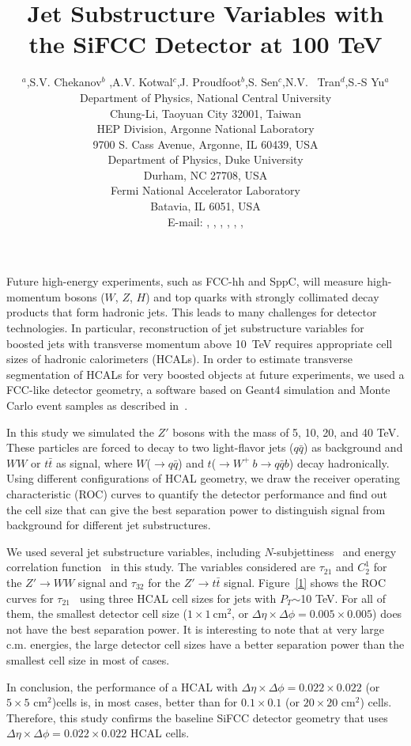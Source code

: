 \documentclass[a4paper]{PoS}
\title{Jet Substructure Variables with the SiFCC Detector at 100 TeV}
\author{\speaker{C.-H Yeh}$^a$,S.V. Chekanov$^b$ ,A.V. Kotwal$^{c}$,J. Proudfoot$^{b}$,S. Sen$^{c}$,N.V. ~Tran$^{d}$,S.-S Yu$^{a}$\\     
     \llap{$^a$}Department of Physics, National Central University\\
     Chung-Li, Taoyuan City 32001, Taiwan\\
     \llap{$^b$}HEP Division, Argonne National Laboratory\\
     9700 S. Cass Avenue, Argonne, IL 60439, USA\\
     \llap{$^c$}Department of Physics, Duke University\\
     Durham, NC 27708, USA\\
     \llap{$^d$}Fermi National Accelerator Laboratory\\
     Batavia, IL 6051, USA\\
     E-mail:  \email{a9510130375@gmail.com},
     \email{chekanov@anl.gov},
     \email{kotwal@phy.duke.edu},
     \email{proudfoot@anl.gov},
     \email{sourav.sen@duke.edu},
     \email{ntran@fnal.gov},
     \email{syu@phy.ncu.edu.tw}}
\begin{document}
Future high-energy experiments, such as FCC-hh and SppC, 
will measure high-momentum bosons ($W$, $Z$, $H$) and top quarks 
with strongly collimated decay products that form hadronic jets. This leads to many
challenges for detector technologies.  In particular, reconstruction of jet substructure  variables for boosted jets with transverse
momentum above 10~TeV
requires appropriate  cell sizes of hadronic
calorimeters  (HCALs). In order to estimate 
transverse segmentation  
of HCALs for very boosted objects at future experiments, 
we used a FCC-like detector geometry,
a software based on Geant4 simulation and Monte Carlo event samples as described in~\cite{Chekanov:2016ppq}.
 
In this study we simulated the $Z'$ bosons with the mass of 5, 10, 20, and 40 TeV. These particles are forced to decay to two light-flavor jets ($q\bar{q}$) as background and $W W$ or $t\bar{t}$ as signal, where $W$($\rightarrow q\bar{q}$) and $t$($ \rightarrow  W^+\>b \rightarrow q\bar{q} b$) decay hadronically. Using different configurations of HCAL geometry, we draw the receiver operating characteristic (ROC) curves to quantify the detector performance and find out the cell size that can give the best separation power to distinguish signal from background for different jet substructures.

We used several jet substructure variables, including $N$-subjettiness~\cite{Thaler:2010tr} and energy correlation function~\cite{Larkoski:2013eya} in this study. The variables considered are $\tau_{21}$ and $C_2^1$ for the $Z'\rightarrow WW$ signal and $\tau_{32}$ for the $Z' \rightarrow t\bar{t}$ signal. Figure~\ref{1} shows the ROC curves for $\tau_{21}$~\cite{Thaler:2010tr} using three HCAL cell sizes for jets with $P_{T}$$\sim$10 TeV. For all of them, the smallest detector cell size ($1\times1~\mathrm{cm}^2$, or $\Delta \eta \times \Delta \phi = 0.005\times0.005$) does not have the best separation power. It is interesting to note that at very large c.m. energies, the large detector cell sizes have a better separation power than the smallest cell size in most of cases. 

In conclusion, the  performance 
of a  HCAL with 
$\Delta \eta \times \Delta \phi = 0.022\times0.022$ (or $5\times5$ cm$^2$)cells is, in most cases,
better than for $0.1\times0.1$ (or $20\times20$ cm$^2$) cells.
Therefore, this study confirms the  baseline SiFCC detector geometry \cite{Chekanov:2016ppq}
that uses $\Delta \eta \times \Delta \phi = 0.022\times0.022$ HCAL cells.
\end{document}

